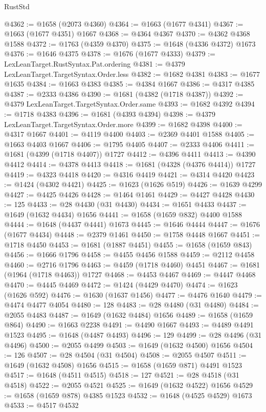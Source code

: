 \begin{lexlean}{RustStd}
\begin{coremodule}
@4362 := @1658 (@2073 @4360)
@4364 := @1663 (@1677 @4341)
@4367 := @1663 (@1677 @4351) @1667
@4368 := @4364 @4367
@4370 := @4362 @4368 @1588
@4372 := @1763 (@4359 @4370)
@4375 := @1648 (@4336 @4372) @1673
@4376 := @1646 @4375
@4378 := @1676 (@1677 @4333)
@4379 := LexLeanTarget.RustSyntax.Pat.ordering
@4381 := @4379 LexLeanTarget.TargetSyntax.Order.less
@4382 := @1682 @4381
@4383 := @1677 @1635
@4384 := @1663 @4383
@4385 := @4384 @1667
@4386 := @4317 @4385
@4387 := @2333 @4386
@4390 := @1681 (@4382 (@1718 @4387))
@4392 := @4379 LexLeanTarget.TargetSyntax.Order.same
@4393 := @1682 @4392
@4394 := @1718 @4383
@4396 := @1681 (@4393 @4394)
@4398 := @4379 LexLeanTarget.TargetSyntax.Order.more
@4399 := @1682 @4398
@4400 := @4317 @1667
@4401 := @4119 @4400
@4403 := @2369 @4401 @1588
@4405 := @1663 @4403 @1667
@4406 := @1795 @4405
@4407 := @2333 @4406
@4411 := @1681 (@4399 (@1718 @4407)) @1727
@4412 := @4396 @4411
@4413 := @4390 @4412
@4414 := @4378 @4413
@4418 := @1681 (@4328 (@4376 @4414)) @1727
@4419 := @4323 @4418
@4420 := @4316 @4419
@4421 := @4314 @4420
@4423 := @1424 (@4302 @4421)
@4425 := @1623 (@1626 @519)
@4426 := @1639 @4299
@4427 := @4425 @4426
@4428 := @1464 @1461
@4429 := @4427 @4428
@4430 := 125
@4433 := @28 @4430 (@31 @4430)
@4434 := @1651 @4433
@4437 := @1649 (@1632 @4434) @1656
@4441 := @1658 (@1659 @832) @4400 @1588
@4444 := @1648 (@4437 @4441) @1673
@4445 := @1646 @4444
@4447 := @1676 (@1677 @4434)
@4448 := @2379 @1461
@4450 := @1758 @4448 @1667
@4451 := @1718 @4450
@4453 := @1681 (@1887 @4451)
@4455 := @1658 (@1659 @843)
@4456 := @1666 @1796
@4458 := @4455 @4456 @1588
@4459 := @2112 @4458
@4460 := @2716 @1796
@4463 := @4459 (@1718 @4460) @4451
@4467 := @1681 (@1964 (@1718 @4463)) @1727
@4468 := @4453 @4467
@4469 := @4447 @4468
@4470 := @4445 @4469
@4472 := @1424 (@4429 @4470)
@4474 := @1623 (@1626 @592)
@4476 := @1630 (@1637 @1456)
@4477 := @4476 @1640
@4479 := @4474 @4477 @4054
@4480 := 128
@4483 := @28 @4480 (@31 @4480)
@4484 := @2055 @4483
@4487 := @1649 (@1632 @4484) @1656
@4489 := @1658 (@1659 @864)
@4490 := @1663 @2238
@4491 := @4490 @1667
@4493 := @4489 @4491 @1523
@4495 := @1648 (@4487 @4493)
@4496 := 129
@4499 := @28 @4496 (@31 @4496)
@4500 := @2055 @4499
@4503 := @1649 (@1632 @4500) @1656
@4504 := 126
@4507 := @28 @4504 (@31 @4504)
@4508 := @2055 @4507
@4511 := @1649 (@1632 @4508) @1656
@4515 := @1658 (@1659 @871) @4491 @1523
@4517 := @1648 (@4511 @4515)
@4518 := 127
@4521 := @28 @4518 (@31 @4518)
@4522 := @2055 @4521
@4525 := @1649 (@1632 @4522) @1656
@4529 := @1658 (@1659 @878) @4385 @1523
@4532 := @1648 (@4525 @4529) @1673
@4533 := @4517 @4532

\end{coremodule}
\end{lexlean}
